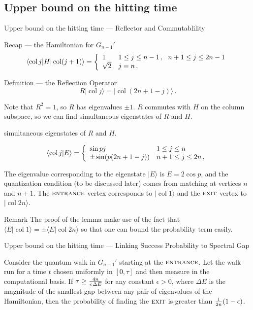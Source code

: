 \documentclass{beamer}
\makeatletter
\newcommand{\<}{\langle}
\renewcommand{\>}{\rangle}
\newcommand{\be}{\begin{equation}}
\newcommand{\ee}{\end{equation}}
\newcommand{\cond}[1]{\left\{\begin{array}{l@{~~~}l}#1\end{array}\right.}
\newcommand{\ent}{{\textsc{entrance}}}
\newcommand{\exit}{{\textsc{exit}}}
\newcommand{\col}{\mathop{\mathrm{col}}\nolimits}
\makeatother
\begin{document}
\subsection{Upper bound on the hitting time}\label{subsec:hitting}

\begin{frame}[allowframebreaks]{Upper bound on the hitting time --- Reflector and Commutablility}
\begin{block}{Recap --- the Hamiltonian for $G_{n-1}'$}
\be
  \<\col j|H|\col(j+1)\> = \cond{
   1      & 1 \le j \le n-1 \,,~~ n+1 \le j \le 2n-1 \\
   \sqrt2 & j=n \,,}
\ee
\end{block}

\begin{block}{Definition --- the Reflection Operator}
\be
  R|\col j\> = |\col(2n+1-j)\>
\,.
\ee
\end{block}
Note that $R^2=1$, so $R$ has eigenvalues $\pm 1$.  $R$ commutes with $H$
on the column subspace, so we can find simultaneous eigenstates of $R$ and
$H$. 

\framebreak

\begin{block}{simultaneous eigenstates of $R$ and
$H$. }

\be
  \<\col j|E\> = \cond{
    \sin p j          & 1 \le j \le n \\
    \pm\sin(p(2n+1-j)) & n+1 \le j \le 2n \,, }
\label{eq:eigenstates}
\ee

\end{block}
The eigenvalue corresponding to the eigenstate $|E\>$ is $E=2 \cos p$, and the
quantization condition (to be discussed later) comes from matching at
vertices $n$ and $n+1$.  The $\ent$ vertex corresponds to $|\col 1\>$ and
the $\exit$ vertex to $|\col 2n\>$.

\begin{alertblock}{Remark}
The proof of the lemma make use of the fact that $\<E|\col 1\>=\pm\<E|\col
2n\>$ so that one can bound the probability term easily. 
\end{alertblock}

\end{frame}

\begin{frame}[allowframebreaks]{Upper bound on the hitting time --- Linking Success Probability to Spectral Gap}

\begin{lemma}\label{lemma:hitting}
Consider the quantum walk in $G_{n-1}'$ starting at the $\ent$.  Let the
walk run for a time $t$ chosen uniformly in $[0,\tau]$ and then measure in
the computational basis.  If $\tau \ge {4n \over \epsilon \, \Delta E}$
for any constant $\epsilon>0$, where $\Delta E$ is the magnitude of the
smallest gap between any pair of eigenvalues of the Hamiltonian, then the
probability of finding the $\exit$ is greater than ${1 \over
2n}(1-\epsilon)$.
\end{lemma}

\end{frame}
\end{document}
